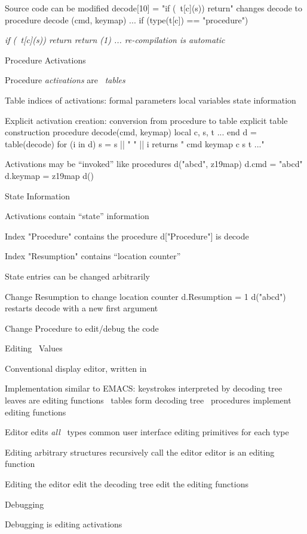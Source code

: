 \Bullet Source code can be modified
\program
		decode[10] = "if (~t[c](s)) return"
\endprogram
\medskip
		changes {\pt decode} to
\program
		procedure decode (cmd, keymap)
			...
			if (type(t[c]) == "procedure") {
				\begingroup\sl if (~t[c](s)) return\endgroup
				return (1)
			...
\endprogram
\medskip
		re-compilation is automatic
\Longtrue
\NewPage
\centerline{\bigrm Procedure Activations}
\Bullet Procedure {\it activations\/} are \EZ\ {\it tables}

\Bullet Table indices of activations:
		formal parameters
		local variables
		state information

\Bullet Explicit activation creation:
		conversion from procedure to table
		explicit table construction
\program
		procedure decode(cmd, keymap)
			local c, s, t
			...
		end
\medskip
		d = table(decode)
\endprogram
\medskip
		{\pt for (i in d) s = s || " " || i}
		returns {\pt " cmd keymap c s t ..."}

\Bullet Activations may be ``invoked'' like procedures
\program
		d("abcd", z19map)
		d.cmd = "abcd"
		d.keymap = z19map
		d()
\endprogram
\NewPage
\centerline{\bigrm State Information}
\Bullet Activations contain ``state'' information

\Bullet Index {\pt "Procedure"} contains the procedure
\program
		d["Procedure"] \rm is \pt decode
\endprogram

\Bullet Index {\pt "Resumption"} contains ``location counter''

\Bullet State entries can be changed arbitrarily

\Bullet Change {\pt Resumption} to change location counter
\program
		d.Resumption = 1
		d("abcd")
\endprogram
\medskip
		restarts {\pt decode} with a new first argument

\Bullet Change {\pt Procedure} to edit/debug the code
\NewPage
\centerline{\bigrm Editing \EZ\ Values}
\Bullet Conventional display editor, written in \EZ

\Bullet Implementation similar to EMACS:
		keystrokes interpreted by decoding tree
		leaves are editing functions
		\EZ\ tables form decoding tree
		\EZ\ procedures implement editing functions

\Bullet Editor edits {\it all\/} \EZ\ types
		common user interface
		editing primitives for each type

\Bullet Editing arbitrary structures
		recursively call the editor
		editor is an editing function 

\Bullet Editing the editor
		edit the decoding tree 
		edit the editing functions
\NewPage
\centerline{\bigrm Debugging}
\Bullet Debugging is editing activations

}
